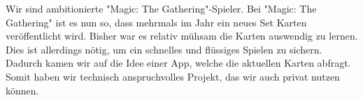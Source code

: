 Wir sind ambitionierte "Magic: The Gathering"-Spieler. Bei "Magic: The Gathering" ist es nun so, dass mehrmals im Jahr ein neues Set Karten ver\"offentlicht wird. Bisher war es relativ m\"uhsam die Karten auswendig zu lernen. Dies ist allerdings n\"otig, um ein schnelles und fl\"ussiges Spielen zu sichern. Dadurch kamen wir auf die Idee einer App, welche die aktuellen Karten abfragt. Somit haben wir technisch anspruchvolles Projekt, das wir auch privat nutzen k\"onnen.